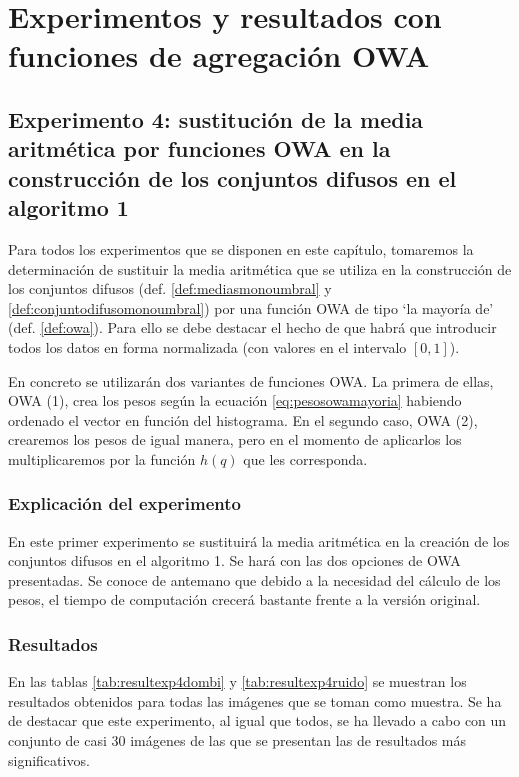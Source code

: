 \documentclass[main]{subfiles}
\begin{document}
\section{Experimentos y resultados con funciones de agregación OWA}

\subsection{Experimento 4: sustitución de la media aritmética por funciones OWA en la construcción de los conjuntos difusos en el algoritmo 1}
Para todos los experimentos que se disponen en este capítulo, tomaremos la determinación de sustituir la media aritmética que se utiliza en la construcción de los conjuntos difusos (def. \ref{def:mediasmonoumbral} y \ref{def:conjuntodifusomonoumbral}) por una función OWA de tipo `la mayoría de' (def. \ref{def:owa}). Para ello se debe destacar el hecho de que habrá que introducir todos los datos en forma normalizada (con valores en el intervalo $[0,1]$).

En concreto se utilizarán dos variantes de funciones OWA. La primera de ellas, OWA (1), crea los pesos según la ecuación \ref{eq:pesosowamayoria} habiendo ordenado el vector en función del histograma. En el segundo caso, OWA (2), crearemos los pesos de igual manera, pero en el momento de aplicarlos los multiplicaremos por la función $h(q)$ que les corresponda.

\subsubsection{Explicación del experimento}
En este primer experimento se sustituirá la media aritmética en la creación de los conjuntos difusos en el algoritmo 1. Se hará con las dos opciones de OWA presentadas. Se conoce de antemano que debido a la necesidad del cálculo de los pesos, el tiempo de computación crecerá bastante frente a la versión original.


\subsubsection{Resultados}

En las tablas \ref{tab:resultexp4dombi} y \ref{tab:resultexp4ruido} se muestran los resultados obtenidos para todas las imágenes que se toman como muestra. Se ha de destacar que este experimento, al igual que todos, se ha llevado a cabo con un conjunto de casi 30 imágenes de las que se presentan las de resultados más significativos.
\end{document}
